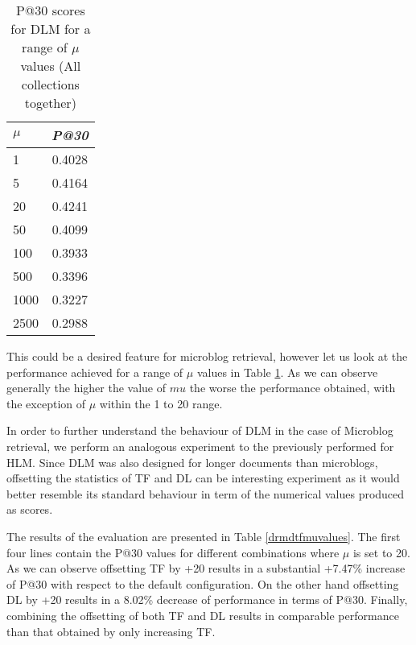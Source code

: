 \begin{table}[]

	\caption{P@30 scores for DLM for a range of $\mu$ values (All collections together)}
	\centering
	\begin{tabular}{l|c} 	
	\textit{\textbf{$\mu$}} & 
	\textit{\textbf{P@30}} 	
	\tabularnewline
	\hline
	1 & 0.4028 \\
	5 &  0.4164 \\
	20 & 0.4241 \\
	50 &  0.4099 \\
	100 &  0.3933 \\
	500 &  0.3396 \\
	1000 & 0.3227 \\
	2500 & 0.2988 \\
	\hline	
	\end{tabular}
	\label{drmmuvalues}
\end{table}

This could be a desired feature for microblog retrieval, however let us look at the performance achieved for a range of $\mu$ values in Table \ref{drmmuvalues}. As we can observe generally the higher the value of $mu$ the worse the performance obtained, with the exception of $\mu$ within the 1 to 20 range. 

In order to further understand the behaviour of DLM in the case of Microblog retrieval, we perform an analogous experiment to the previously performed for HLM. Since DLM was also designed for longer documents than microblogs, offsetting the statistics of TF and DL can be interesting experiment as it would better resemble its standard behaviour in term of the numerical values produced as scores. 

The results of the evaluation are presented in Table \ref{drmdtfmuvalues}. The first four lines contain the P@30 values for different combinations where $\mu$ is set to 20. As we can observe offsetting TF by +20 results in a substantial +7.47\% increase of P@30 with respect to the default configuration. On the other hand offsetting DL by +20 results in a 8.02\% decrease of performance in terms of P@30. Finally, combining the offsetting of both TF and DL results in comparable performance than that obtained by only increasing TF.

